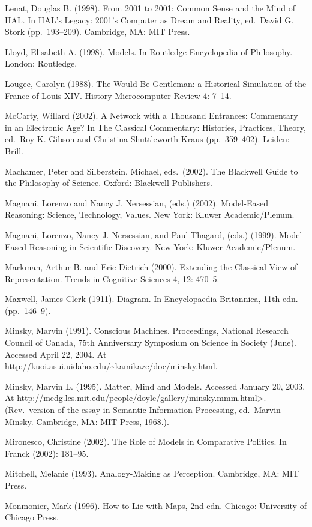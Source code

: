 Lenat, Douglas B. (1998). From 2001 to 2001: Common Sense and the Mind
of HAL. In HAL's Legacy: 2001's Computer as Dream and Reality, ed.~David
G. Stork (pp.~193--209). Cambridge, MA: MIT Press.

Lloyd, Elisabeth A. (1998). Models. In Routledge Encyclopedia of
Philosophy. London: Routledge.

Lougee, Carolyn (1988). The Would-Be Gentleman: a Historical Simulation
of the France of Louis XIV. History Microcomputer Review 4: 7--14.

McCarty, Willard (2002). A Network with a Thousand Entrances: Commentary
in an Electronic Age? In The Classical Commentary: Histories, Practices,
Theory, ed.~Roy K. Gibson and Christina Shuttleworth Kraus
(pp.~359--402). Leiden: Brill.

Machamer, Peter and Silberstein, Michael, eds.~(2002). The Blackwell
Guide to the Philosophy of Science. Oxford: Blackwell Publishers.

Magnani, Lorenzo and Nancy J. Nersessian, (eds.) (2002). Model-Eased
Reasoning: Science, Technology, Values. New York: Kluwer
Academic/Plenum.

Magnani, Lorenzo, Nancy J. Nersessian, and Paul Thagard, (eds.) (1999).
Model-Eased Reasoning in Scientific Discovery. New York: Kluwer
Academic/Plenum.

Markman, Arthur B. and Eric Dietrich (2000). Extending the Classical
View of Representation. Trends in Cognitive Sciences 4, 12: 470--5.

Maxwell, James Clerk (1911). Diagram. In Encyclopaedia Britannica, 11th
edn. (pp.~146--9).

Minsky, Marvin (1991). Conscious Machines. Proceedings, National
Research Council of Canada, 75th Anniversary Symposium on Science in
Society (June). Accessed April 22, 2004. At
\url{http://kuoi.asui.uidaho.edu/~kamikaze/doc/minsky.html}.

Minsky, Marvin L. (1995). Matter, Mind and Models. Accessed January 20,
2003. At
http://medg.lcs.mit.edu/people/doyle/gallery/minsky.mmm.html\textgreater.
(Rev.~version of the essay in Semantic Information Processing,
ed.~Marvin Minsky. Cambridge, MA: MIT Press, 1968.).

Mironesco, Christine (2002). The Role of Models in Comparative Politics.
In Franck (2002): 181--95.

Mitchell, Melanie (1993). Analogy-Making as Perception. Cambridge, MA:
MIT Press.

Monmonier, Mark (1996). How to Lie with Maps, 2nd edn. Chicago:
University of Chicago Press.

